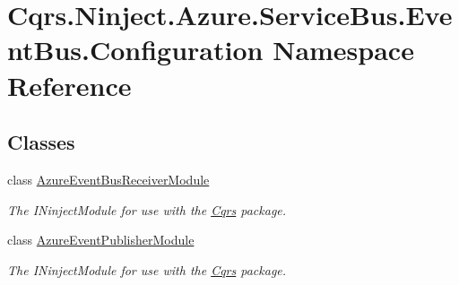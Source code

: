 \hypertarget{namespaceCqrs_1_1Ninject_1_1Azure_1_1ServiceBus_1_1EventBus_1_1Configuration}{}\section{Cqrs.\+Ninject.\+Azure.\+Service\+Bus.\+Event\+Bus.\+Configuration Namespace Reference}
\label{namespaceCqrs_1_1Ninject_1_1Azure_1_1ServiceBus_1_1EventBus_1_1Configuration}
\subsection*{Classes}
\begin{DoxyCompactItemize}
\item 
class \hyperlink{classCqrs_1_1Ninject_1_1Azure_1_1ServiceBus_1_1EventBus_1_1Configuration_1_1AzureEventBusReceiverModule}{Azure\+Event\+Bus\+Receiver\+Module}
\begin{DoxyCompactList}\small\item\em The I\+Ninject\+Module for use with the \hyperlink{namespaceCqrs}{Cqrs} package. \end{DoxyCompactList}\item 
class \hyperlink{classCqrs_1_1Ninject_1_1Azure_1_1ServiceBus_1_1EventBus_1_1Configuration_1_1AzureEventPublisherModule}{Azure\+Event\+Publisher\+Module}
\begin{DoxyCompactList}\small\item\em The I\+Ninject\+Module for use with the \hyperlink{namespaceCqrs}{Cqrs} package. \end{DoxyCompactList}\end{DoxyCompactItemize}
